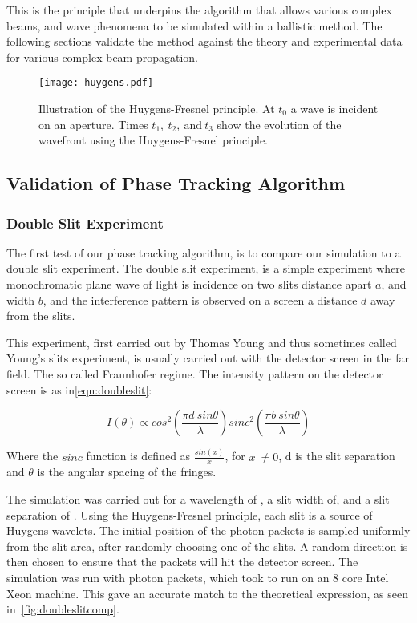 \medskip

This is the principle that underpins the algorithm that allows various complex beams, and wave phenomena to be simulated within a ballistic method. The following sections validate the method against the theory and experimental data for various complex beam propagation.

\begin{figure}[!ht]
    \centering
    \texttt{[image: huygens.pdf]}
    \caption{Illustration of the Huygens-Fresnel principle. At $t_0$ a wave is incident on an aperture. Times $t_1,\ t_2,\ \text{and}\ t_3$ show the evolution of the wavefront using the Huygens-Fresnel principle.}
    \label{fig:huygensillis}
\end{figure}

\subsection{Validation of Phase Tracking Algorithm}

\subsubsection*{Double Slit Experiment}

The first test of our phase tracking algorithm, is to compare our simulation to a double slit experiment.
The double slit experiment, is a simple experiment where monochromatic plane wave of light is incidence on two slits distance apart $a$, and width $b$, and the interference pattern is observed on a screen a distance $d$ away from the slits.

This experiment, first carried out by Thomas Young and thus sometimes called Young's slits experiment, is usually carried out with the detector screen in the far field. The so called Fraunhofer regime.
The intensity pattern on the detector screen is as in\cref{eqn:doubleslit}:

\begin{equation}
    I(\theta) \propto cos^2\left(\frac{\pi d\ sin \theta}{\lambda}\right)sinc^2\left(\frac{\pi b\ sin\theta}{\lambda}\right)
    \label{eqn:doubleslit}
\end{equation}

Where the $sinc$ function is defined as $\tfrac{sin(x)}{x}$, for $x\ \neq 0$, d is the slit separation and $\theta$ is the angular spacing of the fringes.

The simulation was carried out for a wavelength of , a slit width of, and a slit separation of .
Using the Huygens-Fresnel principle, each slit is a source of Huygens wavelets.
The initial position of the photon packets is sampled uniformly from the slit area, after randomly choosing one of the slits.
A random direction is then chosen to ensure that the packets will hit the detector screen.
The simulation was run with photon packets, which took to run on an 8 core Intel Xeon machine.
This gave an accurate match to the theoretical expression, as seen in~\cref{fig:doubleslitcomp}.


